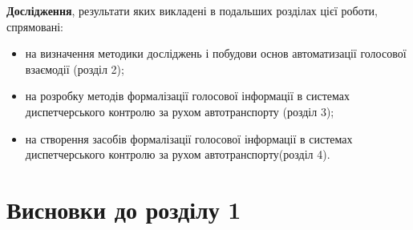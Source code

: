 \textbf{Дослідження}, результати яких викладені в подальших розділах цієї роботи, спрямовані:

\begin{itemize}
	\item на визначення методики досліджень і побудови  основ автоматизації голосової взаємодії (розділ 2);
	\item на розробку методів формалізації голосової інформації в системах диспетчерського контролю за рухом автотранспорту (розділ 3);
	\item на створення засобів формалізації голосової інформації в системах диспетчерського контролю за рухом автотранспорту(розділ 4).
\end{itemize}

\section*{Висновки до розділу 1}
